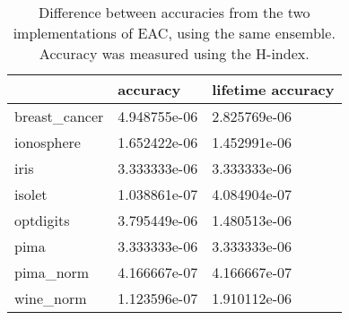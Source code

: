 

\begin{table}[h]
\centering
\caption{Difference between accuracies from the two implementations of EAC, using the same ensemble. Accuracy was measured using the H-index.}

\begin{tabular}{lll}
\toprule
{} &      accuracy & lifetime accuracy \\
\midrule
breast\_cancer &  4.948755e-06 &      2.825769e-06 \\
ionosphere    &  1.652422e-06 &      1.452991e-06 \\
iris          &  3.333333e-06 &      3.333333e-06 \\
isolet        &  1.038861e-07 &      4.084904e-07 \\
optdigits     &  3.795449e-06 &      1.480513e-06 \\
pima          &  3.333333e-06 &      3.333333e-06 \\
pima\_norm     &  4.166667e-07 &      4.166667e-07 \\
wine\_norm     &  1.123596e-07 &      1.910112e-06 \\
\bottomrule
\end{tabular}

\label{tab:validation error acc}
\end{table}






